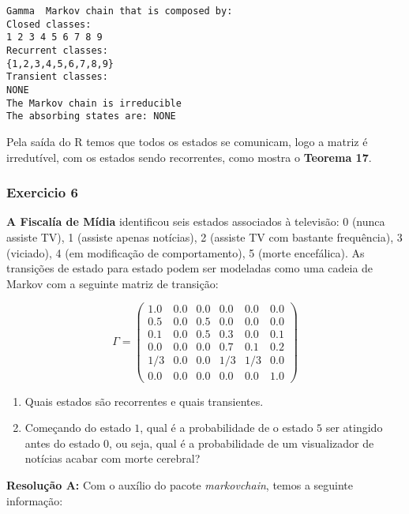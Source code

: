 \documentclass[
]{article}
\providecommand{\tightlist}{%
  \setlength{\itemsep}{0pt}\setlength{\parskip}{0pt}}
\begin{document}
\begin{verbatim}
Gamma  Markov chain that is composed by: 
Closed classes: 
1 2 3 4 5 6 7 8 9 
Recurrent classes: 
{1,2,3,4,5,6,7,8,9}
Transient classes: 
NONE 
The Markov chain is irreducible 
The absorbing states are: NONE
\end{verbatim}

Pela saída do R temos que todos os estados se comunicam, logo a matriz é
irredutível, com os estados sendo recorrentes, como mostra o
\textbf{Teorema 17}.

\pagebreak

\hypertarget{exercicio-6}{%
\subsubsection{Exercicio 6}\label{exercicio-6}}

\textbf{A Fiscalía de Mídia} identificou seis estados associados à
televisão: 0 (nunca assiste TV), 1 (assiste apenas notícias), 2 (assiste
TV com bastante frequência), 3 (viciado), 4 (em modificação de
comportamento), 5 (morte encefálica). As transições de estado para
estado podem ser modeladas como uma cadeia de Markov com a seguinte
matriz de transição:

\[\Gamma = \begin{pmatrix}
1.0 & 0.0 & 0.0 & 0.0 & 0.0 & 0.0 \\
0.5 & 0.0 & 0.5 & 0.0 & 0.0 & 0.0 \\
0.1 & 0.0 & 0.5 & 0.3 & 0.0 & 0.1 \\
0.0 & 0.0 & 0.0 & 0.7 & 0.1 & 0.2 \\
1/3 & 0.0 & 0.0 & 1/3 & 1/3 & 0.0 \\
0.0 & 0.0 & 0.0 & 0.0 & 0.0 & 1.0
\end{pmatrix}\]

\begin{enumerate}
\def\labelenumi{\alph{enumi})}
\tightlist
\item
  Quais estados são recorrentes e quais transientes.
\item
  Começando do estado \(1\), qual é a probabilidade de o estado \(5\)
  ser atingido antes do estado \(0\), ou seja, qual é a probabilidade de
  um visualizador de notícias acabar com morte cerebral?
\end{enumerate}

\textbf{Resolução A:} Com o auxílio do pacote \emph{markovchain}, temos
a seguinte informação:
\end{document}
